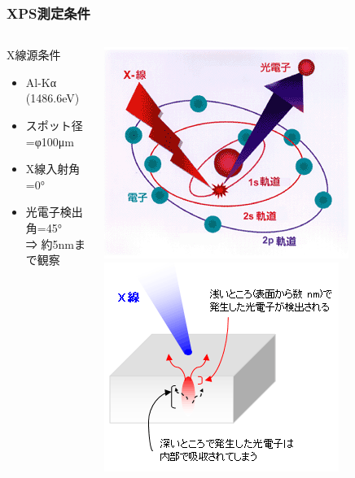 \documentclass[12pt, dvipdfmx]{beamer}
\begin{document}
\begin{frame}\frametitle{XPS測定条件}
	\begin{columns}[c, onlytextwidth]
			\begin{block}{X線源条件}
				\begin{itemize}
					\item Al-Kα (1486.6eV)
					\item スポット径=φ100μm
					\item X線入射角=0°
					\item 光電子検出角=45° \\⇒ 約5nmまで観察
				\end{itemize}
			\end{block}
			\centering
			\includegraphics[width=.7\textwidth]{XPS_Genri_1.png}
			\vspace{3mm}
			\includegraphics[width=.7\textwidth]{XPS_Genri_3.png}
	\end{columns}
\end{frame}
	
\end{document}
